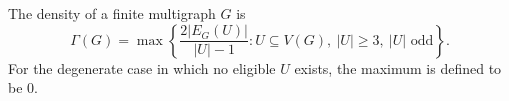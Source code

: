 \begin{definition}
The density of a finite multigraph $G$ is
\[
 \Gamma(G)=\max\left\{\frac{2|E_G(U)|}{|U|-1}:
 U\subseteq V(G),\ |U|\ge3,\ |U|\text{ odd}\right\}.
\]
For the degenerate case in which no eligible $U$ exists, the maximum is
defined to be $0$.
\end{definition}
